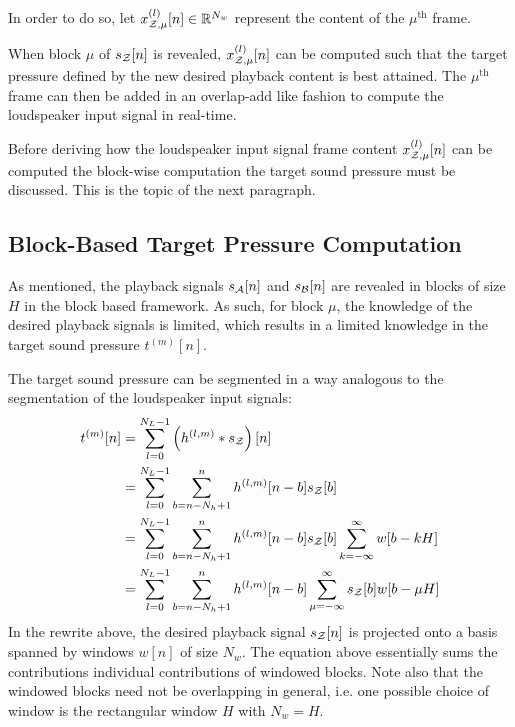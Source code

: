 In order to do so, let $x^{(l)}_{\mathcal{Z},\mu}[n]\in\mathbb{R}^{N_w}$ represent the content of the $\mu^\text{th}$ frame.  

When block $\mu$ of $s_{\mathcal{Z}}[n]$ is revealed, $x^{(l)}_{\mathcal{Z},\mu}[n]$ can be computed such that the target pressure defined by the new desired playback content is best attained.
The $\mu^\text{th}$ frame can then be added in an overlap-add like fashion to compute the loudspeaker input signal in real-time.

Before deriving how the loudspeaker input signal frame content $x^{(l)}_{\mathcal{Z},\mu}[n]$ can be computed 
the block-wise computation the target sound pressure must be discussed.
This is the topic of the next paragraph.

\subsection{Block-Based Target Pressure Computation}
As mentioned, the playback signals $s_{\mathcal{A}}[n]$ and $s_{\mathcal{B}}[n]$ are revealed in blocks of size $H$ in the block based framework.
As such, for block $\mu$, the knowledge of the desired playback signals is limited, which results in a limited knowledge in the target sound pressure $t^{(m)}[n]$.

The target sound pressure can be segmented in a way analogous to the segmentation of the loudspeaker input signals:
\begin{align}
    t^{(m)}[n] &= \sum_{l=0}^{N_L - 1} \left(h^{(l,m)} \ast s_{\mathcal{Z}}\right)[n] \\
               &= \sum_{l=0}^{N_L - 1} \sum_{b = n - N_h + 1}^{n} h^{(l,m)}[n - b] s_{\mathcal{Z}}[b] \\
               &= \sum_{l=0}^{N_L - 1} \sum_{b = n - N_h + 1}^{n} h^{(l,m)}[n - b] s_{\mathcal{Z}}[b] \sum_{k=-\infty}^{\infty} w[b - kH] \\
               &= \sum_{l=0}^{N_L - 1} \sum_{b = n - N_h + 1}^{n} h^{(l,m)}[n - b] \sum_{\mu =-\infty}^{\infty} s_{\mathcal{Z}}[b] w[b - \mu H] \\
\end{align}
In the rewrite above, the desired playback signal $s_{\mathcal{Z}}[n]$ is projected onto a basis spanned by windows $w[n]$ of size $N_w$. 
The equation above essentially sums the contributions individual contributions of windowed blocks.
Note also that the windowed blocks need not be overlapping in general, i.e. one possible choice of window is the rectangular window $H$ with $N_w = H$.

